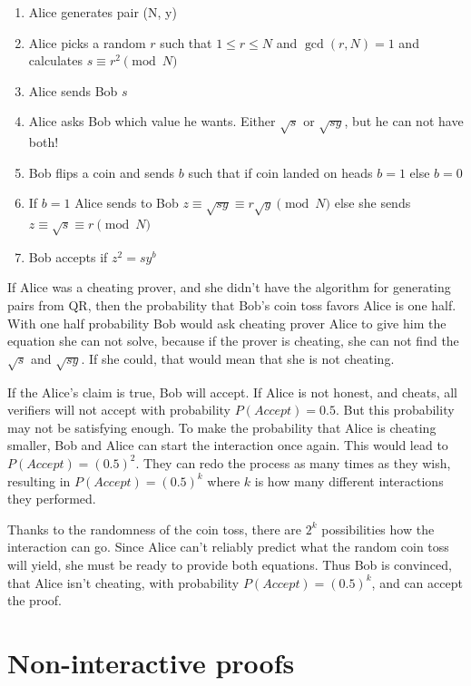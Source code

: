 \begin{enumerate}
    \item Alice generates pair (N, y)
    \item Alice picks a random $r$ such that $1 \leq r \leq N$ and $\gcd(r, N) = 1$
          and calculates $s \equiv r^2 \pmod{N}$
    \item Alice sends Bob $s$
    \item Alice asks Bob which value he wants. Either $\sqrt{s}$ or $\sqrt{sy}$, but he can not have both!
    \item Bob flips a coin and sends $b$ such that if coin landed on heads $b = 1$ else $b = 0$
    \item If $b = 1$ Alice sends to Bob $z \equiv \sqrt{sy} \equiv r \sqrt{y} \pmod{N}$ else she sends $z \equiv \sqrt{s} \equiv r \pmod{N}$
    \item Bob accepts if $z^2 = sy^b$
\end{enumerate}

If Alice was a cheating prover, and she didn't have the algorithm for
generating pairs from QR, then the probability that Bob's coin toss favors
Alice is one half. With one half probability Bob would ask cheating prover
Alice to give him the equation she can not solve, because if the prover is
cheating, she can not find the $\sqrt{s}$ and $\sqrt{sy}$. If she could,
that would mean that she is not cheating.

If the Alice's claim is true, Bob will accept. If Alice is not honest, and
cheats, all verifiers will not accept with probability $P(Accept) = 0.5$.
But this probability may not be satisfying enough. To make the probability
that Alice is cheating smaller, Bob and Alice can start the interaction once
again. This would lead to $P(Accept) = (0.5)^2$. They can redo the process
as many times as they wish, resulting in $P(Accept) = (0.5)^k$ where $k$
is how many different interactions they performed.

Thanks to the randomness of the coin toss, there are $2^k$ possibilities how
the interaction can go. Since Alice can't reliably predict what the random
coin toss will yield, she must be ready to provide both equations. Thus Bob is
convinced, that Alice isn't cheating, with probability $P(Accept) = (0.5)^k$,
and can accept the proof.

\section{Non-interactive proofs}

